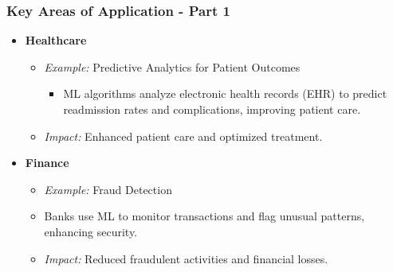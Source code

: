 \documentclass[aspectratio=169]{beamer}
\begin{document}
\begin{frame}[fragile]
    \frametitle{Key Areas of Application - Part 1}
    \begin{itemize}
        \item \textbf{Healthcare}
            \begin{itemize}
                \item \textit{Example:} Predictive Analytics for Patient Outcomes
                \begin{itemize}
                    \item ML algorithms analyze electronic health records (EHR) to predict readmission rates and complications, improving patient care.
                \end{itemize}
                \item \textit{Impact:} Enhanced patient care and optimized treatment.
            \end{itemize}
        \item \textbf{Finance}
            \begin{itemize}
                \item \textit{Example:} Fraud Detection
                \item Banks use ML to monitor transactions and flag unusual patterns, enhancing security.
                \item \textit{Impact:} Reduced fraudulent activities and financial losses.
            \end{itemize}
    \end{itemize}
\end{frame}
\end{document}
